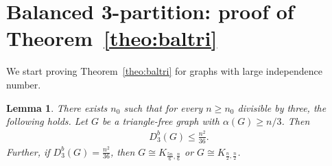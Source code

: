 \documentclass[11pt]{article}
\newtheorem{lemma}[theo]{Lemma}
\theoremstyle{definition}
\numberwithin{theo}{section}
\begin{document}
\section{Balanced 3-partition: proof of Theorem~\ref{theo:baltri}}
\label{sec:baltri}
We start proving Theorem~\ref{theo:baltri} for graphs with large independence number.
\begin{lemma}
\label{lem:triplargeind}
There exists $n_0$ such that for every $n\geq n_0$ divisible by three, the following holds. Let $G$ be a triangle-free graph with $\alpha(G)\geq n/3$. Then 
\begin{align*}
    D_3^b(G)\leq \frac{n^2}{36}.
\end{align*}
Further, if $D_3^b(G)=\frac{n^2}{36}$, then $G\cong K_{\frac{5n}{6},\frac{n}{6}}$ or $G\cong K_{\frac{n}{2},\frac{n}{2}}$. 
\end{lemma}
\end{document}
